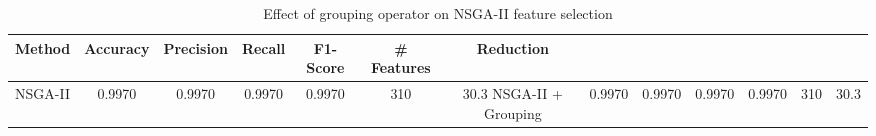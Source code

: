 \begin{table}[htbp]
\centering
\caption{Effect of grouping operator on NSGA-II feature selection}
\label{tab:table9}
\begin{tabular}{lcccccc}
\toprule
Method & Accuracy & Precision & Recall & F1-Score & \# Features & Reduction \\
\midrule
NSGA-II & 0.9970 & 0.9970 & 0.9970 & 0.9970 & 310 & 30.3%
NSGA-II + Grouping & 0.9970 & 0.9970 & 0.9970 & 0.9970 & 310 & 30.3%
\bottomrule
\end{tabular}
\end{table}